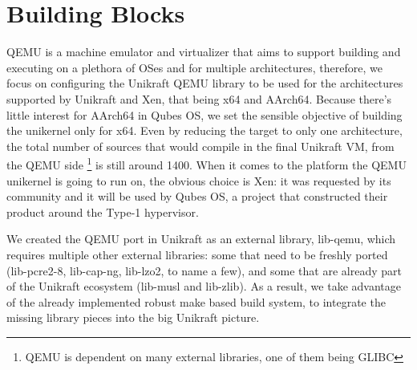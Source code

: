 \chapter{Building Blocks}
\label{chapter:building-blocks}

QEMU is a machine emulator and virtualizer that aims to support building and executing on a plethora of OSes and for multiple architectures, therefore, we focus on configuring the Unikraft QEMU library to be used for the architectures supported by Unikraft and Xen, that being x64 and AArch64.
Because there's little interest for AArch64 in Qubes OS, we set the sensible objective of building the unikernel only for x64.
Even by reducing the target to only one architecture, the total number of sources that would compile in the final Unikraft VM, from the QEMU side \footnote{QEMU is dependent on many external libraries, one of them being GLIBC} is still around 1400.
When it comes to the platform the QEMU unikernel is going to run on, the obvious choice is Xen: it was requested by its community and it will be used by Qubes OS, a project that constructed their product around the Type-1 hypervisor.

We created the QEMU port in Unikraft as an external library, lib-qemu, which requires multiple other external libraries: some that need to be freshly ported (lib-pcre2-8, lib-cap-ng, lib-lzo2, to name a few), and some that are already part of the Unikraft ecosystem (lib-musl and lib-zlib).
As a result, we take advantage of the already implemented robust make based build system, to integrate the missing library pieces into the big Unikraft picture.
